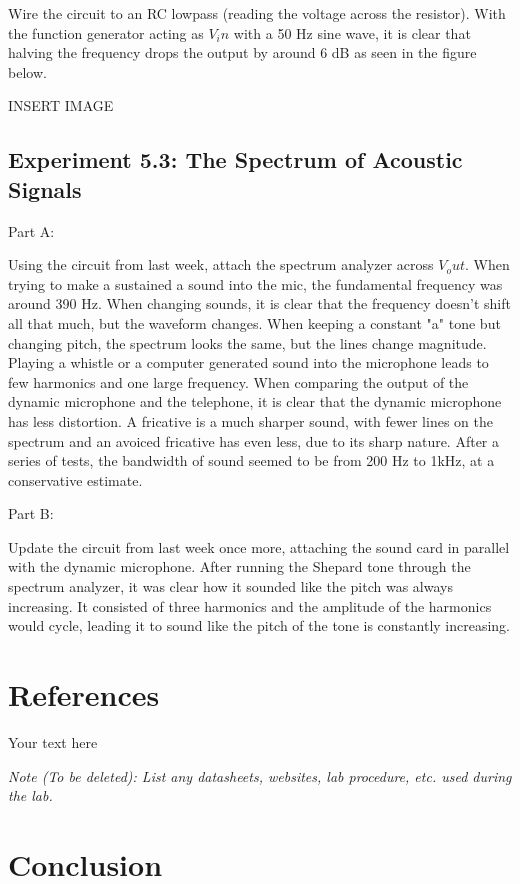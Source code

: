 \documentclass[10pt]{article}
\begin{document}
Wire the circuit to an RC lowpass (reading the voltage across the resistor). With the function generator acting as $V_in$ with a 50 Hz sine wave, it is clear that halving the frequency drops the output by around 6 dB as seen in the figure below.

INSERT IMAGE 

\subsection{Experiment 5.3: The Spectrum of Acoustic Signals}

Part A:

Using the circuit from last week, attach the spectrum analyzer across $V_out$. When trying to make a sustained a sound into the mic, the fundamental frequency was around 390 Hz. When changing sounds, it is clear that the frequency doesn't shift all that much, but the waveform changes. When keeping a constant "a" tone but changing pitch, the spectrum looks the same, but the lines change magnitude. Playing a whistle or a computer generated sound into the microphone leads to few harmonics and one large frequency. When comparing the output of the dynamic microphone and the telephone, it is clear that the dynamic microphone has less distortion. A fricative is a much sharper sound, with fewer lines on the spectrum and an avoiced fricative has even less, due to its sharp nature. After a series of tests, the bandwidth of sound seemed to be from 200 Hz to 1kHz, at a conservative estimate.

Part B:

Update the circuit from last week once more, attaching the sound card in parallel with the dynamic microphone.  After running the Shepard tone through the spectrum analyzer, it was clear how it sounded like the pitch was always increasing. It consisted of three harmonics and the amplitude of the harmonics would cycle, leading it to sound like the pitch of the tone is constantly increasing. 


\section{References}

Your text here

\medskip

\textit{Note (To be deleted): List any datasheets, websites, lab procedure, etc. used during the lab.}

\section{Conclusion}
\end{document}
